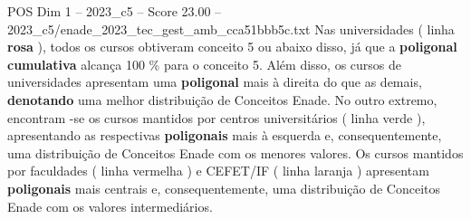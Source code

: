 \begin{textsample}{POS Dim 1 – 2023\_c5 – Score 23.00 – 2023\_c5/enade\_2023\_tec\_gest\_amb\_cca51bbb5c.txt}
Nas universidades ( linha \textbf{rosa} ), todos os cursos obtiveram conceito 5 ou abaixo disso, já que a \textbf{poligonal} \textbf{cumulativa} alcança 100 \% para o conceito 5.
Além disso, os cursos de universidades apresentam uma \textbf{poligonal} mais à direita do que as demais, \textbf{denotando} uma melhor distribuição de Conceitos Enade.
No outro extremo, encontram -se os cursos mantidos por centros universitários ( linha verde ), apresentando as respectivas \textbf{poligonais} mais à esquerda e, consequentemente, uma distribuição de Conceitos Enade com os menores valores.
Os cursos mantidos por faculdades ( linha vermelha ) e CEFET/IF ( linha laranja ) apresentam \textbf{poligonais} mais centrais e, consequentemente, uma distribuição de Conceitos Enade com os valores intermediários.

\end{textsample}
